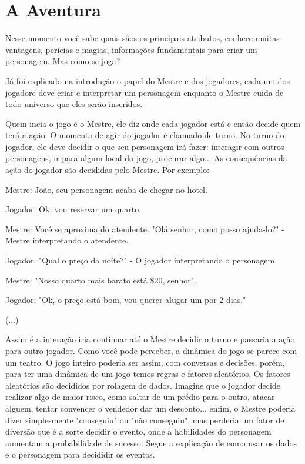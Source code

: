 \chapter{A Aventura}
\label{ch:adventure}

Nesse momento você sabe quais sãos os principais atributos,  conhece muitas vantagens, perícias e magias, informações fundamentais para criar um personagem. Mas como se joga?

Já foi explicado na introdução o papel do Mestre e dos jogadores, cada um dos jogadore deve criar e interpretar um personagem enquanto o Mestre cuida de todo universo que eles serão inseridos.

Quem incia o jogo é o Mestre, ele diz onde cada jogador está e então decide quem terá a ação. O momento de agir do jogador é chamado de turno. No turno do jogador, ele deve decidir o que seu personagem irá fazer: interagir com outros personagens, ir para algum local do jogo, procurar algo... As consequências da ação do jogador são decididas pelo Mestre. Por exemplo:

Mestre: João, seu personagem acaba de chegar no hotel.

Jogador: Ok, vou reservar um quarto.

Mestre: Você se aproxima do atendente. "Olá senhor, como posso ajuda-lo?" - Mestre interpretando o atendente.

Jogador: "Qual o preço da noite?" - O jogador interpretando o personagem.

Mestre: "Nosso quarto mais barato está \$20, senhor".

Jogador: "Ok, o preço está bom, vou querer alugar um por 2 dias."

(...)

Assim é a interação iria continuar até o Mestre decidir o turno e passaria a ação para outro jogador. Como você pode perceber, a dinâmica do jogo se parece com um teatro. O jogo inteiro poderia ser assim, com conversas e decisões, porém, para ter uma dinâmica de um jogo temos regras e fatores aleatórios. Os fatores aleatórios são decididos por rolagem de dados. Imagine que o jogador decide realizar algo de maior risco, como saltar de um prédio para o outro, atacar alguem, tentar convencer o vendedor dar um desconto... enfim, o Mestre poderia dizer simplesmente "conseguiu" ou "não conseguiu", mas perderia um fator de diversão que é a sorte decidir o evento, onde a habilidades do personagem aumentam a probabilidade de sucesso. Segue a explicação de como usar os dados e o personagem para decididir os eventos.

